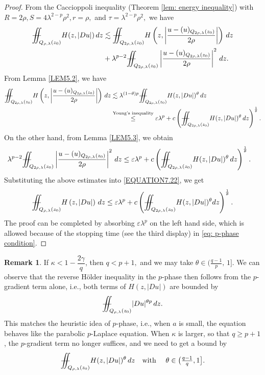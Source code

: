 \documentclass[notitlepage,11pt,reqno]{amsart}
\theoremstyle{definition}
\newtheorem{remark}[theorem]{Remark}
\numberwithin{equation}{section}
\newcommand{\la}{\lambda}
\newcommand{\iintss}{{\int\hspace{-0.28cm}\int}}
\newcommand{ \miints }{{\iintss\hspace{-0.56cm} -\hspace{-0.15cm}-}}
\newcommand{\miint}[1]{{\miints_{\hspace{-0.13cm}#1}}}
\begin{document}
\begin{proof}
From the Caccioppoli inequality (Theorem \ref{lem: energy inequality}) with $R=2\rho, S=4\lambda^{2-p}\rho^2, r=\rho,$ and $\tau=\lambda^{2-p}\rho^2,$ we have
\begin{align}\label{EQUATION7.22}
    \miint{Q_{\rho, \lambda}(z_0)} H(z, |D u|)\, dz &\lesssim \miint{Q_{2\rho, \lambda}(z_0)} H\left(z, \left|\frac{u-(u)_{Q_{2\rho, \lambda}(z_0)}}{2\rho}\right|\right)\,dz\nonumber\\
	 &+\lambda^{p-2} \miint{Q_{2\rho, \lambda}(z_0)}\left|\frac{u-(u)_{Q_{2\rho, \lambda}(z_0)}}{2\rho}\right|^2\,dz.
\end{align}
From Lemma \ref{LEM5.2}, we have
\begin{align*}
\miint{Q_{2\rho, \lambda}(z_0)} H\left(z, \left|\frac{u-(u)_{Q_{2\rho, \lambda}(z_0)}}{2\rho}\right|\right)\,dz
&\lesssim \lambda^{(1-\theta)p} \miint{Q_{2\rho, \lambda}(z_0)}H(z, |D u|)^{\theta}\,dz\\
&\overset{\text{Young's inequality}}{\leq} \varepsilon \la^p + c \left(\miint{Q_{2\rho, \lambda}(z_0)}H(z,|D u|)^{\theta}\, dz\right)^{\frac{1}{\theta}}.
\end{align*}
 On the other hand, from Lemma \ref{LEM5.3}, we obtain
\begin{align*}
 \lambda^{p-2} \miint{Q_{2\rho, \lambda}(z_0)}\left|\frac{u-(u)_{Q_{2\rho, \lambda}(z_0)}}{2\rho}\right|^2\,dz &\leq \varepsilon \la^p + c \left(\miint{Q_{2\rho, \lambda}(z_0)}H(z, |D u|)^{\theta}\, dz\right)^{\frac{1}{\theta}}.
\end{align*}
Substituting the above estimates into \eqref{EQUATION7.22}, we get
\begin{align*}
   \miint{Q_{\rho, \lambda}(z_0)} H\left(z, |D u|\right)\, dz \leq \varepsilon \la^p + c \left(\miint{Q_{2\rho, \lambda}(z_0)}H(z, |D u|)^{\theta}dz\right)^{\frac{1}{\theta}}.
\end{align*}
The proof can be completed by absorbing $\varepsilon \la^p$ on the left hand side, which is allowed because of the stopping time (see the third display) in \eqref{eq: p-phase condition}.
\end{proof}
\begin{remark} If $\kappa < 1 - \dfrac{2\gamma}{q}$, then $q<p+1,$ and we may take $\theta\in\bigl(\tfrac{q-1}{p},\,1\bigr].$ We can observe that the reverse H\"older inequality in the $p$-phase then follows from the $p$-gradient term alone, i.e., both terms of $H(z,|Du|)$ are bounded by
$$\miint{Q_{\rho,\lambda}(z_0)}|Du|^{\theta p}\,dz.$$ This matches the heuristic idea of $p$-phase, i.e., when 
$a$ is small, the equation behaves like the parabolic $p$-Laplace equation. When $\kappa$ is larger, so that $q \ge p+1$, the $p$-gradient term no longer suffices, and we need to get a bound by
$$\miint{Q_{\rho,\lambda}(z_0)} H(z,|Du|)^{\theta}\,dz\quad \text{with }\quad  \theta\in\bigl(\tfrac{q-1}{q},1\bigr].$$
\end{remark}
\end{document}
